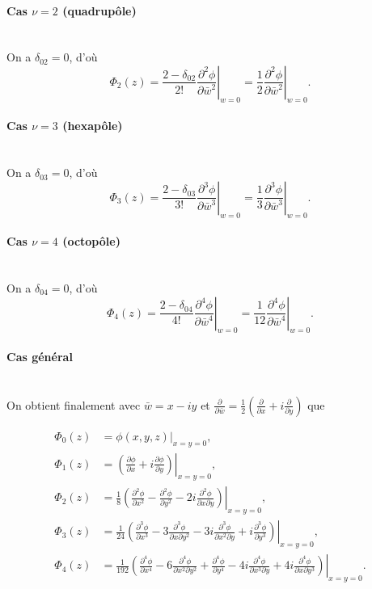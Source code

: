 \documentclass{report}
\begin{document}
\paragraph{Cas \(\nu = 2\) (quadrupôle)}
\
\\
On a \(\delta_{02} = 0\), d'où
\[
\Phi_2(z) = \frac{2 - \delta_{02}}{2!} \left. \frac{\partial^{2} \phi}{\partial \bar{w}^{2}} \right|_{w=0} = \frac{1}{2} \left. \frac{\partial^{2} \phi}{\partial \bar{w}^{2}} \right|_{w=0}.
\]

\paragraph{Cas \(\nu = 3\) (hexapôle)}
\
\\
On a \(\delta_{03} = 0\), d'où
\[
\Phi_3(z) = \frac{2 - \delta_{03}}{3!} \left. \frac{\partial^{3} \phi}{\partial \bar{w}^{3}} \right|_{w=0} = \frac{1}{3} \left. \frac{\partial^{3} \phi}{\partial \bar{w}^{3}} \right|_{w=0}.
\]

\paragraph{Cas \(\nu = 4\) (octopôle)}
\
\\
On a \(\delta_{04} = 0\), d'où
\[
\Phi_4(z) = \frac{2 - \delta_{04}}{4!} \left. \frac{\partial^{4} \phi}{\partial \bar{w}^{4}} \right|_{w=0} = \frac{1}{12} \left. \frac{\partial^{4} \phi}{\partial \bar{w}^{4}} \right|_{w=0}.
\]

\paragraph{Cas général}
\
\\
On obtient finalement avec \(\bar{w} = x - iy\) et \(\frac{\partial}{\partial \bar{w}} = \frac{1}{2}\left(\frac{\partial}{\partial x} + i\frac{\partial}{\partial y}\right)\) que

\[
\begin{aligned}
\Phi_0(z) &= \phi(x, y, z)\big|_{x=y=0}, \\[0.4em]
\Phi_1(z) &= \left. \left( \frac{\partial \phi}{\partial x} + i \frac{\partial \phi}{\partial y} \right) \right|_{x=y=0}, \\[0.6em]
\Phi_2(z) &= \left. \frac{1}{8} \left( \frac{\partial^{2} \phi}{\partial x^{2}} - \frac{\partial^{2} \phi}{\partial y^{2}} - 2i \frac{\partial^{2} \phi}{\partial x \partial y} \right) \right|_{x=y=0}, \\[0.6em]
\Phi_3(z) &= \left. \frac{1}{24} \left( \frac{\partial^{3} \phi}{\partial x^{3}} - 3 \frac{\partial^{3} \phi}{\partial x \partial y^{2}} - 3i \frac{\partial^{3} \phi}{\partial x^{2} \partial y} + i \frac{\partial^{3} \phi}{\partial y^{3}} \right) \right|_{x=y=0}, \\[0.6em]
\Phi_4(z) &= \left. \frac{1}{192} \left( \frac{\partial^{4} \phi}{\partial x^{4}} - 6 \frac{\partial^{4} \phi}{\partial x^{2} \partial y^{2}} + \frac{\partial^{4} \phi}{\partial y^{4}} - 4i \frac{\partial^{4} \phi}{\partial x^{3} \partial y} + 4i \frac{\partial^{4} \phi}{\partial x \partial y^{3}} \right) \right|_{x=y=0}.
\end{aligned}
\]
\end{document}
